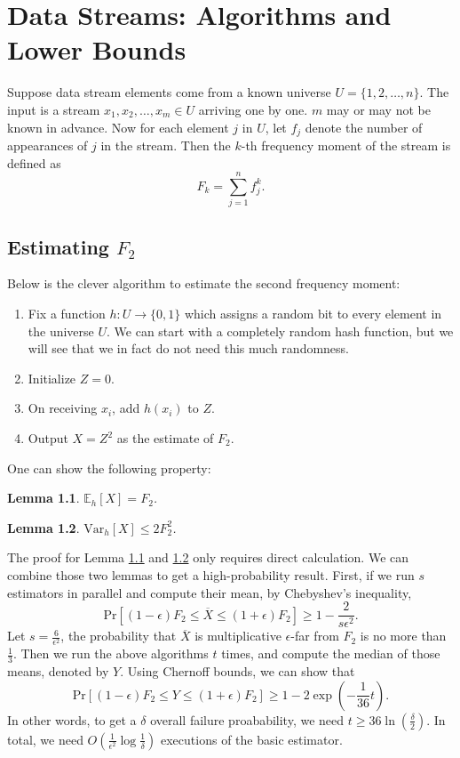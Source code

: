 \documentclass[openany]{book}
\newtheorem{lemma}{Lemma}[chapter]
\begin{document}
\chapter{Data Streams: Algorithms and Lower Bounds}
Suppose data stream elements come from a known universe $U=\{1,2,\ldots,n\}$. The input is a stream $x_1,x_2,\ldots,x_m\in U$ arriving one by one. $m$ may or may not be known in advance. Now for each element $j$ in $U$, let $f_j$ denote the number of appearances of $j$ in the stream. Then the $k$-th frequency moment of the stream is defined as
\begin{equation}\label{freqmoment}
    F_k=\sum_{j=1}^{n}f_j^k.
\end{equation}

\section{Estimating $F_2$}
Below is the clever algorithm to estimate the second frequency moment:
\begin{enumerate}
    \item Fix a function $h:U\to\{0,1\}$ which assigns a random bit to every element in the universe $U$. We can start with a completely random hash function, but we will see that we in fact do not need this much randomness.
    \item Initialize $Z=0$.
    \item On receiving $x_i$, add $h(x_i)$ to $Z$.
    \item Output $X=Z^2$ as the estimate of $F_2$.
\end{enumerate}
One can show the following property:
\begin{lemma}\label{2ndMomentMean}
    $\mathbb{E}_h[X]=F_2$.
\end{lemma}
\begin{lemma}\label{2ndMomentVar}
    $\mathrm{Var}_h[X]\le2F_2^2$.
\end{lemma}
The proof for Lemma \ref{2ndMomentMean} and \ref{2ndMomentVar} only requires direct calculation. We can combine those two lemmas to get a high-probability result. First, if we run $s$ estimators in parallel and compute their mean, by Chebyshev's inequality,
\begin{equation}
    \mathrm{Pr}[(1-\epsilon)F_2\le\overline{X}\le(1+\epsilon)F_2]\ge1-\frac{2}{s\epsilon^2}.
\end{equation}
Let $s=\frac{6}{\epsilon^2}$, the probability that $\overline{X}$ is multiplicative $\epsilon$-far from $F_2$ is no more than $\frac{1}{3}$. Then we run the above algorithms $t$ times, and compute the median of those means, denoted by $Y$. Using Chernoff bounds, we can show that
\begin{equation}
    \mathrm{Pr}[(1-\epsilon)F_2\le Y\le(1+\epsilon)F_2]\ge1-2\exp(-\frac{1}{36}t).
\end{equation}
In other words, to get a $\delta$ overall failure proabability, we need $t\ge36\ln(\frac{\delta}{2})$. In total, we need $O(\frac{1}{\epsilon^2}\log \frac{1}{\delta})$ executions of the basic estimator.
\end{document}
